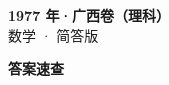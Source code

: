 \documentclass[zihao=-4, a4paper]{ctexart}
\begin{document}
\begin{center}
  {\Large\bfseries 1977 年·广西卷（理科）}\\[4pt]
  {\large 数学 · 简答版}
\end{center}
\medskip
{}

\clearpage
{}
\begin{center}{\Large\bfseries 答案速查}\end{center}
\medskip

\end{document}
